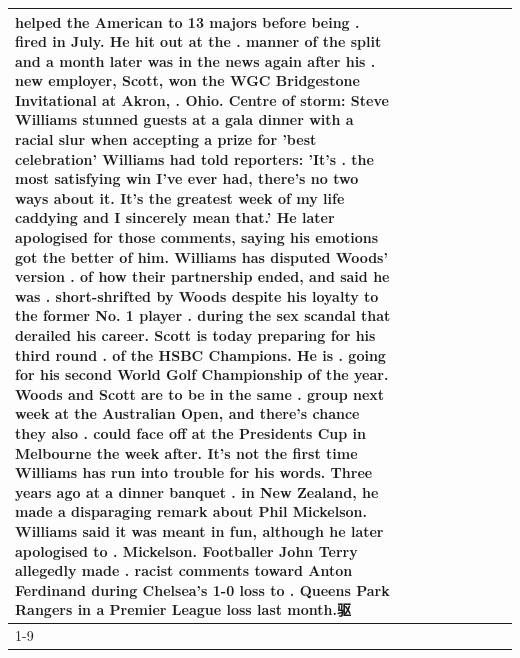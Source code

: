 \begin{table}[H]
\begin{tabular}{lllrlllll}
helped the American to 13 majors before being . fired in July. He hit out at the . manner of the split and a month later was in the news again after his . new employer, Scott, won the WGC Bridgestone Invitational at Akron, . Ohio. Centre of storm: Steve Williams stunned guests at a gala dinner with a racial slur when accepting a prize for 'best celebration' Williams had told reporters: 'It's . the most satisfying win I've ever had, there's no two ways about it. It's the greatest week of my life caddying and I sincerely mean that.' He later apologised for those comments, saying his emotions got the better of him. Williams has disputed Woods' version . of how their partnership ended, and said he was . short-shrifted by Woods despite his loyalty to the former No. 1 player . during the sex scandal that derailed his career. Scott is today preparing for his third round . of the HSBC Champions. He is . going for his second World Golf Championship of the year. Woods and Scott are to be in the same . group next week at the Australian Open, and there's chance they also . could face off at the Presidents Cup in Melbourne the week after. It's not the first time Williams has run into trouble for his words. Three years ago at a dinner banquet . in New Zealand, he made a disparaging remark about Phil Mickelson. Williams said it was meant in fun, although he later apologised to . Mickelson. Footballer John Terry allegedly made . racist comments toward Anton Ferdinand during Chelsea's 1-0 loss to . Queens Park Rangers in a Premier League loss last month.驱 \\
\cline{1-9}

\end{tabular}
\end{table}
